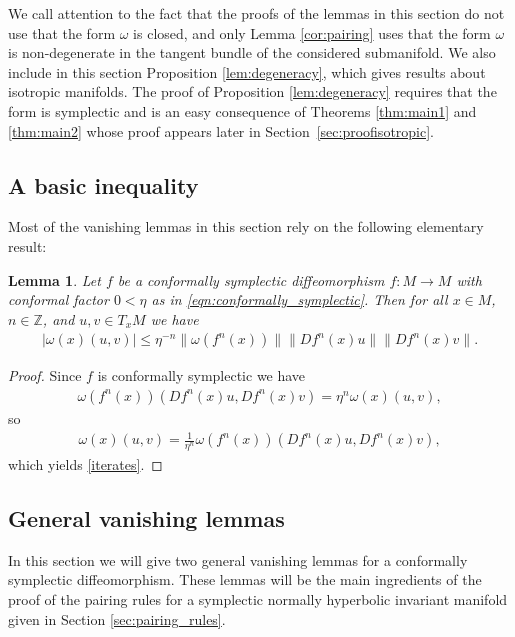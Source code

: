 \documentclass[11pt]{amsart}
\newtheorem{lem}[thm]{Lemma}
\theoremstyle{definition}
\theoremstyle{remark}
\numberwithin{equation}{section}
\begin{document}
We call attention to the fact that  the proofs of the lemmas in this section
do not use that the form $\omega$ is closed, and only Lemma  \ref{cor:pairing} uses that the form  $\omega$ is non-degenerate in the tangent bundle of the considered submanifold.
We also include in this section Proposition \ref{lem:degeneracy}, which gives results about isotropic manifolds.
The proof of Proposition \ref{lem:degeneracy} requires that the form is symplectic and is an easy consequence of Theorems \ref{thm:main1} and \ref{thm:main2} whose proof appears later in Section~\ref{sec:proofisotropic}.

\subsection{A basic inequality}
\label{sec:basic}


Most of the vanishing lemmas in this section rely on the following  elementary result:

\begin{lem}\label{lem:iterates}
Let $f$ be  a conformally symplectic  diffeomorphism $f:M\to M$ with conformal factor $0<\eta$ as in  \eqref{eqn:conformally_symplectic}.
Then for all $x\in M$, $n\in\mathbb{Z}$, and $u,v \in T_xM$  we have
\begin{equation}\label{iterates}
\begin{split}
|\omega(x)(u,v)| \le   \eta^{-n}\|\omega (f^n(x))\|\|Df^n(x)u\|\|Df^n(x)v \|.
\end{split}
\end{equation}
\end{lem}

\begin{proof}
Since $f$ is conformally symplectic we have
\begin{equation*}
\begin{split}
\omega (f^n(x))(Df^n(x)u,Df^n(x)v)= \eta^n\omega(x)(u,v) ,
\end{split}
\end{equation*}
so
\begin{equation}\label{eq:basicequatily}
\begin{split}
\omega(x)(u,v) =\frac{1}{\eta^n}\omega (f^n(x))(Df^n(x)u,Df^n(x)v),
\end{split}
\end{equation}
which yields \eqref{iterates}.
\end{proof}



\subsection{General vanishing lemmas}
In this section  we will give two general vanishing lemmas for a conformally symplectic diffeomorphism.
These lemmas will be the main ingredients of the
proof of the pairing rules for a symplectic normally hyperbolic invariant manifold given in Section \ref{sec:pairing_rules}.
\end{document}
